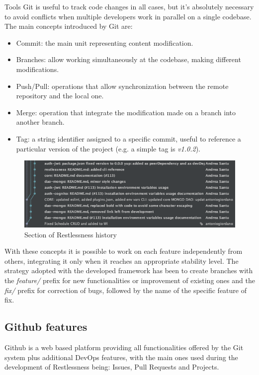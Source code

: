 \begin{chapter}{Tools}
    Git is useful to track code changes in all cases, but it's absolutely necessary
    to avoid conflicts when multiple developers work in parallel on a single codebase.
    The main concepts introduced by Git are:
    \begin{itemize}
        \item Commit: the main unit representing content modification.
        \item Branches: allow working simultaneously at the codebase, making
            different modifications.
        \item Push/Pull: operations that allow synchronization between the remote
            repository and the local one.
        \item Merge: operation that integrate the modification made on a branch
            into another branch.
        \item Tag: a string identifier assigned to a specific commit, useful to
            reference a particular version of the project (e.g. a simple tag is
            \textit{v1.0.2}).
    \end{itemize}

    \begin{figure}
        \centering
        \includegraphics[width=\linewidth]{source/images/rln-git-history.png}
        \caption{Section of Restlessness history}
    \end{figure}

    With these concepts it is possible to work on each feature independently from
    others, integrating it only when it reaches an appropriate stability level.
    The strategy adopted with the developed framework has been to create branches
    with the \textit{feature/} prefix for new functionalities or improvement of
    existing ones and the \textit{fix/} prefix for correction of bugs, followed
    by the name of the specific feature of fix.

    \subsection{Github features}
    Github is a web based platform providing all functionalities offered by the Git
    system plus additional DevOps features, with the main ones used during the
    development of Restlessness being: Issues, Pull Requests and Projects.


\end{chapter}
